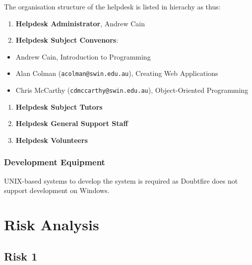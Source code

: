 \documentclass[12pt,a4paper,]{article}
\providecommand{\tightlist}{%
  \setlength{\itemsep}{0pt}\setlength{\parskip}{0pt}}
\begin{document}
The organisation structure of the helpdesk is listed in hierachy as
thus:

\begin{enumerate}
\def\labelenumi{\arabic{enumi}.}
\tightlist
\item
  \textbf{Helpdesk Administrator}, Andrew Cain
\item
  \textbf{Helpdesk Subject Convenors}:
\end{enumerate}

\begin{itemize}
\tightlist
\item
  Andrew Cain, Introduction to Programming
\item
  Alan Colman (\texttt{acolman@swin.edu.au}), Creating Web Applications
\item
  Chris McCarthy (\texttt{cdmccarthy@swin.edu.au}), Object-Oriented
  Programming
\end{itemize}

\begin{enumerate}
\def\labelenumi{\arabic{enumi}.}
\setcounter{enumi}{2}
\tightlist
\item
  \textbf{Helpdesk Subject Tutors}
\item
  \textbf{Helpdesk General Support Staff}
\item
  \textbf{Helpdesk Volunteers}
\end{enumerate}

\subsubsection{Development Equipment}\label{development-equipment}

UNIX-based systems to develop the system is required as Doubtfire does
not support development on Windows.

\section{Risk Analysis}\label{risk-analysis}

\subsection{Risk 1}\label{risk-1}
\end{document}
